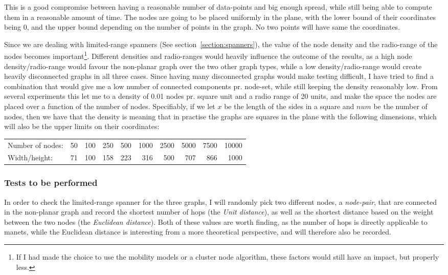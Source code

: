This is a good compromise between having a reasonable number of data-points and big enough spread, while still being able to compute them in a reasonable amount of time. The nodes are going to be placed uniformly in the plane, with the lower bound of their coordinates being 0, and the upper bound depending on the number of points in the graph. No two points will have same the coordinates. 

Since we are dealing with limited-range spanners (See section~\ref{section:spanners}), the value of the node density and the radio-range of the nodes becomes important\footnote{If I had made the choice to use the mobility models or a cluster node algorithm, these factors would still have an impact, but properly less.}. Different densities and radio-ranges would heavily influence the outcome of the results, as a high node density/radio-range would favour the non-planar graph over the two other graph types, while a low density/radio-range would create heavily disconnected graphs in all three cases. Since having many disconnected graphs would make testing difficult, I have tried to find a combination that would give me a low number of connected components pr. node-set, while still keeping the density reasonably low. From several experiments this let me to a density of 0.01 nodes pr. square unit and a radio range of 20 units, and make the space the nodes are placed over a function of the number of nodes. Specifiably, if we let $x$ be the length of the sides in a square and $num$ be the number of nodes, then we have that the density is
meaning that in practise the graphs are squares in the plane with the following dimensions, which will also be the upper limits on their coordinates:\\
{\tiny
\begin{tabular}{lrrrrrrrrr}
Number of nodes: & 50 & 100 & 250 & 500 & 1000 & 2500 & 5000 & 7500 & 10000 \\
Width/height:    & 71 & 100 & 158 & 223 &  316 &  500 &  707 &  866 & 1000 
\end{tabular} 
}

\subsubsection{Tests to be performed}
\label{section:spanner_tests_performed}
In order to check the limited-range spanner for the three graphs, I will randomly pick two different nodes, a \emph{node-pair}, that are connected in the non-planar graph and record the shortest number of hops (the \emph{Unit distance}), as well as the shortest distance based on the weight between the two nodes (the \emph{Euclidean distance}). Both of these values are worth finding, as the number of hops is directly applicable to \acp{manet}, while the Euclidean distance is interesting from a more theoretical perspective, and will therefore also be recorded.

